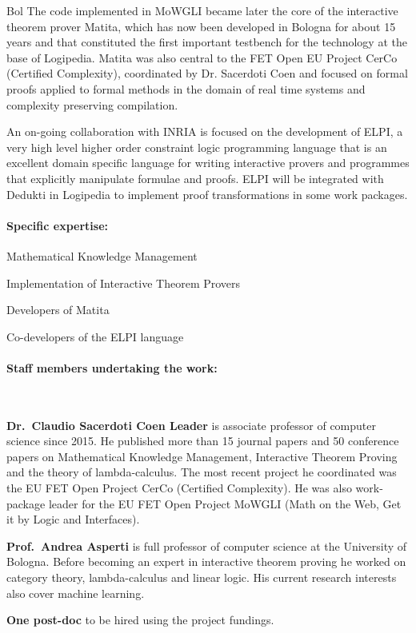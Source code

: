 \begin{sitedescription}{Bol}
The code implemented in MoWGLI became later the core of the interactive theorem prover Matita, which has now been developed in Bologna for about 15 years and that constituted the first important testbench for the technology at the base of Logipedia. Matita was also central to the FET Open EU Project CerCo (Certified Complexity), coordinated by Dr. Sacerdoti Coen and focused on formal proofs applied to formal methods in the domain of real time systems and complexity preserving compilation.

An on-going collaboration with INRIA is focused on the development of ELPI, a very high level higher order constraint logic programming language that is an excellent domain specific language for writing interactive provers and programmes that explicitly manipulate formulae and proofs. ELPI will be integrated with Dedukti in Logipedia to implement proof transformations in some work packages.

\paragraph{Specific expertise:}

\begin{compactitem}
\item Mathematical Knowledge Management
\item Implementation of Interactive Theorem Provers
\item Developers of Matita
\item Co-developers of the ELPI language
\end{compactitem}

\paragraph{Staff members undertaking the work:}~

\textbf{Dr.\ Claudio Sacerdoti Coen Leader} is associate professor of computer science since 2015. He published more than 15 journal papers and 50 conference papers on Mathematical Knowledge Management, Interactive Theorem Proving and the theory of lambda-calculus. The most recent project he coordinated was the EU FET Open Project CerCo (Certified Complexity). He was also work-package leader for the EU FET Open Project MoWGLI (Math on the Web, Get it by Logic and Interfaces).

\textbf{Prof.\ Andrea Asperti} is full professor of computer science at the University of Bologna. Before becoming an expert in interactive theorem proving he worked on category theory, lambda-calculus and linear logic. His current research interests also cover machine learning.

\textbf{One post-doc} to be hired using the project fundings.


\end{sitedescription}

